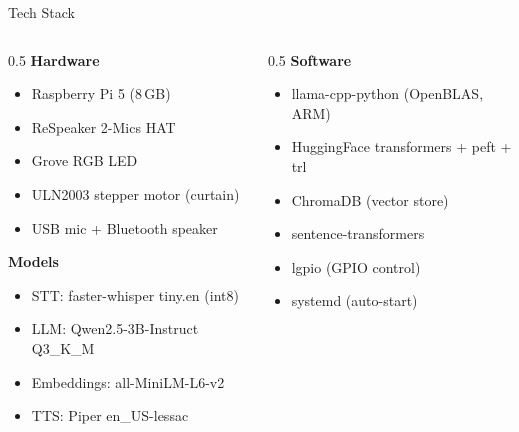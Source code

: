 \documentclass[aspectratio=169]{beamer}
\begin{document}
\begin{frame}{Tech Stack}
\begin{columns}[T,onlytextwidth]
\begin{column}{0.5\textwidth}
\textbf{Hardware}
\begin{itemize}
\item Raspberry Pi 5 (8\,GB)
\item ReSpeaker 2-Mics HAT
\item Grove RGB LED
\item ULN2003 stepper motor (curtain)
\item USB mic + Bluetooth speaker
\end{itemize}

\textbf{Models}
\begin{itemize}
\item STT: faster-whisper tiny.en (int8)
\item LLM: Qwen2.5-3B-Instruct Q3\_K\_M
\item Embeddings: all-MiniLM-L6-v2
\item TTS: Piper en\_US-lessac
\end{itemize}
\end{column}
\begin{column}{0.5\textwidth}
\textbf{Software}
\begin{itemize}
\item llama-cpp-python (OpenBLAS, ARM)
\item HuggingFace transformers + peft + trl
\item ChromaDB (vector store)
\item sentence-transformers
\item lgpio (GPIO control)
\item systemd (auto-start)
\end{itemize}
\end{column}
\end{columns}
\end{frame}
\end{document}
